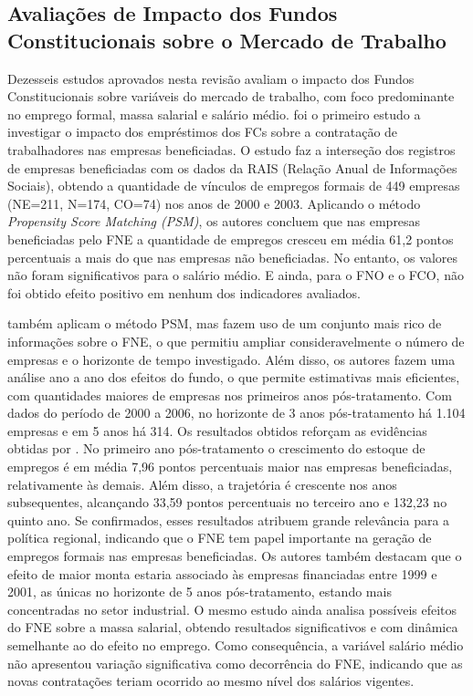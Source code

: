 \subsection{Avaliações de Impacto dos Fundos Constitucionais sobre o Mercado de Trabalho}

Dezesseis estudos aprovados nesta revisão avaliam o impacto dos Fundos Constitucionais sobre variáveis do mercado de trabalho, com foco predominante no emprego formal, massa salarial e salário médio.  foi o primeiro estudo a investigar o impacto dos empréstimos dos FCs sobre a contratação de trabalhadores nas empresas beneficiadas. O estudo faz a interseção dos registros de empresas beneficiadas com os dados da RAIS (Relação Anual de Informações Sociais), obtendo a quantidade de vínculos de empregos formais de 449 empresas (NE=211, N=174, CO=74) nos anos de 2000 e 2003. Aplicando o método \textit{Propensity Score Matching (PSM)}, os autores concluem que nas empresas beneficiadas pelo FNE a quantidade de empregos cresceu em média 61,2 pontos percentuais a mais do que nas empresas não beneficiadas. No entanto, os valores não foram significativos para o salário médio. E ainda, para o FNO e o FCO, não foi obtido efeito positivo em nenhum dos indicadores avaliados.

 também aplicam o método PSM, mas fazem uso de um conjunto mais rico de informações sobre o FNE, o que permitiu ampliar consideravelmente o número de empresas e o horizonte de tempo investigado. Além disso, os autores fazem uma análise ano a ano dos efeitos do fundo, o que permite estimativas mais eficientes, com quantidades maiores de empresas nos primeiros anos pós-tratamento. Com dados do período de 2000 a 2006, no horizonte de 3 anos pós-tratamento há 1.104 empresas e em 5 anos há 314. Os resultados obtidos reforçam as evidências obtidas por . No primeiro ano pós-tratamento o crescimento do estoque de empregos é em média 7,96 pontos percentuais maior nas empresas beneficiadas, relativamente às demais. Além disso, a trajetória é crescente nos anos subsequentes, alcançando 33,59 pontos percentuais no terceiro ano e 132,23 no quinto ano. Se confirmados, esses resultados atribuem grande relevância para a política regional, indicando que o FNE tem papel importante na geração de empregos formais nas empresas beneficiadas. Os autores também destacam que o efeito de maior monta estaria associado às empresas financiadas entre 1999 e 2001, as únicas no horizonte de 5 anos pós-tratamento, estando mais concentradas no setor industrial. O mesmo estudo ainda analisa possíveis efeitos do FNE sobre a massa salarial, obtendo resultados significativos e com dinâmica semelhante ao do efeito no emprego. Como consequência, a variável salário médio não apresentou variação significativa como decorrência do FNE, indicando que as novas contratações teriam ocorrido ao mesmo nível dos salários vigentes.

